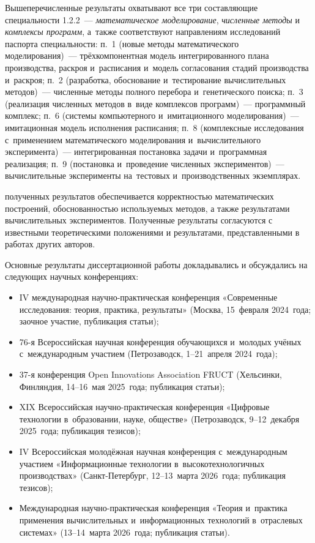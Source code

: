 Вышеперечисленные результаты охватывают все три составляющие специальности 1.2.2~--- \emph{математическое моделирование}, \emph{численные методы} и \emph{комплексы программ}, а~также соответствуют направлениям исследований паспорта специальности:
п.~1 (новые методы математического моделирования)~--- трёхкомпонентная модель интегрированного плана производства, раскроя и~расписания и~модель согласования стадий производства и~раскроя;
п.~2 (разработка, обоснование и~тестирование вычислительных методов)~--- численные методы полного перебора и~генетического поиска;
п.~3 (реализация численных методов в~виде комплексов программ)~--- программный комплекс;
п.~6 (системы компьютерного и~имитационного моделирования)~--- имитационная модель исполнения расписания;
п.~8 (комплексные исследования с~применением математического моделирования и~вычислительного эксперимента)~--- интегрированная постановка задачи и~программная реализация;
п.~9 (постановка и~проведение численных экспериментов)~--- вычислительные эксперименты на~тестовых и~производственных экземплярах.

{\reliability} полученных результатов обеспечивается корректностью
математических построений, обоснованностью используемых методов,
а также результатами вычислительных экспериментов.
Полученные результаты согласуются с известными теоретическими положениями
и результатами, представленными в работах других авторов.

{\probation}
Основные результаты диссертационной работы докладывались и обсуждались на следующих научных конференциях:
\begin{itemize}
  \item IV международная научно-практическая конференция «Современные исследования: теория, практика, результаты» (Москва, 15~февраля 2024~года; заочное участие, публикация статьи);
  \item 76-я Всероссийская научная конференция обучающихся и~молодых учёных с~международным участием (Петрозаводск, 1--21~апреля 2024~года);
  \item 37-я конференция Open Innovations Association FRUCT (Хельсинки, Финляндия, 14--16~мая 2025~года; публикация статьи);
  \item XIX Всероссийская научно-практическая конференция «Цифровые технологии в~образовании, науке, обществе» (Петрозаводск, 9--12~декабря 2025~года; публикация тезисов);
  \item IV Всероссийская молодёжная научная конференция с~международным участием «Информационные технологии в~высокотехнологичных производствах» (Санкт-Петербург, 12--13~марта 2026~года; публикация тезисов);
  \item Международная научно-практическая конференция «Теория и~практика применения вычислительных и~информационных технологий в~отраслевых системах» (13--14~марта 2026~года; публикация статьи).
\end{itemize}

